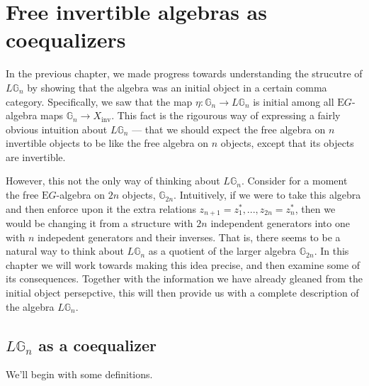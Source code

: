 \section{Free invertible algebras as coequalizers}

In the previous chapter, we made progress towards understanding the strucutre of $L\mathbb{G}_n$ by showing that the algebra was an initial object in a certain comma category. Specifically, we saw that the map $\eta: \mathbb{G}_n \to L\mathbb{G}_n$ is initial among all $\mathrm{E}G$-algebra maps $\mathbb{G}_n \to X_{\mathrm{inv}}$. This fact is the rigourous way of expressing a fairly obvious intuition about $L\mathbb{G}_n$ --- that we should expect the free algebra on $n$ invertible objects to be like the free algebra on $n$ objects, except that its objects are invertible.

However, this not the only way of thinking about $L\mathbb{G}_n$. Consider for a moment the free $\mathrm{E}G$-algebra on $2n$ objects, $\mathbb{G}_{2n}$. Intuitively, if we were to take this algebra and then enforce upon it the extra relations $z_{n+1} = z_1^*, ..., z_{2n} = z_n^*$, then we would be changing it from a structure with $2n$ independent generators into one with $n$ indepedent generators and their inverses. That is, there seems to be a natural way to think about $L\mathbb{G}_n$ as a quotient of the larger algebra $\mathbb{G}_{2n}$. In this chapter we will work towards making this idea precise, and then examine some of its consequences. Together with the information we have already gleaned from the initial object persepctive, this will then provide us with a complete description of the algebra $L\mathbb{G}_n$.

\subsection{$L\mathbb{G}_n$ as a coequalizer} 

We'll begin with some definitions.

